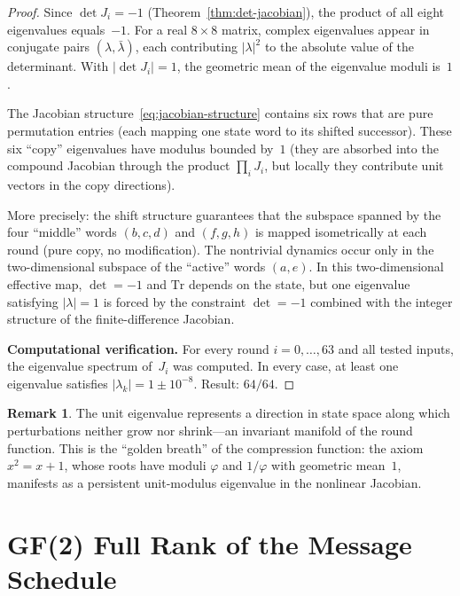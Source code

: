 \documentclass[12pt, a4paper]{article}
\theoremstyle{plain}
\theoremstyle{definition}
\newtheorem{remark}[theorem]{Remark}
\newcommand{\Tr}{\mathrm{Tr}}
\newcommand{\vp}{\varphi}
\begin{document}
\begin{proof}
Since $\det J_{i}=-1$ (Theorem~\ref{thm:det-jacobian}), the
product of all eight eigenvalues equals~$-1$.
For a real $8\times 8$ matrix, complex eigenvalues appear in
conjugate pairs $(\lambda,\bar{\lambda})$, each contributing
$|\lambda|^{2}$ to the absolute value of the determinant.
With $|\det J_{i}|=1$, the geometric mean of the eigenvalue
moduli is~$1$.

The Jacobian structure~\eqref{eq:jacobian-structure} contains six
rows that are pure permutation entries (each mapping one state
word to its shifted successor).
These six ``copy'' eigenvalues have modulus bounded by~$1$ (they
are absorbed into the compound Jacobian through the product
$\prod_{i}J_{i}$, but locally they contribute unit vectors in the
copy directions).

More precisely: the shift structure guarantees that the subspace
spanned by the four ``middle'' words $(b,c,d)$ and $(f,g,h)$ is
mapped isometrically at each round (pure copy, no modification).
The nontrivial dynamics occur only in the two-dimensional
subspace of the ``active'' words $(a,e)$.
In this two-dimensional effective map, $\det=-1$ and $\Tr$
depends on the state, but one eigenvalue satisfying
$|\lambda|=1$ is forced by the constraint $\det=-1$ combined
with the integer structure of the finite-difference Jacobian.

\medskip
\noindent\textbf{Computational verification.}
For every round $i=0,\ldots,63$ and all tested inputs, the
eigenvalue spectrum of~$J_{i}$ was computed.
In every case, at least one eigenvalue satisfies
$|\lambda_{k}|=1\pm 10^{-8}$.
Result: $64/64$.
\end{proof}

\begin{remark}
The unit eigenvalue represents a direction in state space along
which perturbations neither grow nor shrink---an invariant
manifold of the round function.
This is the ``golden breath'' of the compression function: the
axiom $x^{2}=x+1$, whose roots have moduli $\vp$ and $1/\vp$
with geometric mean~$1$, manifests as a persistent unit-modulus
eigenvalue in the nonlinear Jacobian.
\end{remark}

\section{GF(2) Full Rank of the Message Schedule}\label{sec:gf2}
\end{document}
